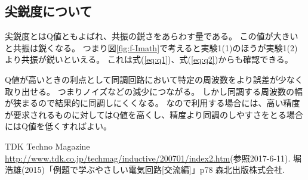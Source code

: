 \documentclass[11pt,a4paper,fleqn]{jsarticle}
\begin{document}
\subsection{尖鋭度について}
尖鋭度とはQ値ともよばれ、共振の鋭さをあらわす量である。
この値が大きいと共振は鋭くなる。
つまり図\ref{fig:f-Imath}で考えると実験1(1)のほうが実験1(2)より共振が鋭いといえる。
これは式(\ref{eq:q1})、式(\ref{eq:q2})からも確認できる。

Q値が高いときの利点として同調回路において特定の周波数をより誤差が少なく取り出せる。
つまりノイズなどの減少につながる。
しかし同調する周波数の幅が狭まるので結果的に同調しにくくなる。
なので利用する場合には、高い精度が要求されるものに対してはQ値を高くし、精度より同調のしやすさをとる場合にはQ値を低くすればよい。
%

\begin{thebibliography}{99}
 TDK Techno Magazine \url{http://www.tdk.co.jp/techmag/inductive/200701/index2.htm}(参照2017-6-11).
 堀浩雄(2015)「例題で学ぶやさしい電気回路[交流編]」p78 森北出版株式会社.
\end{thebibliography}
\end{document}
